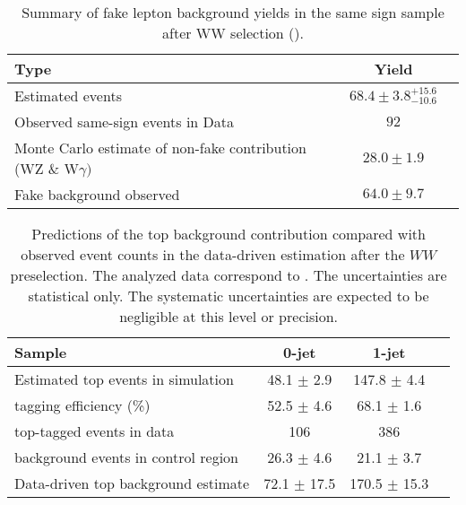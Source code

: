 \begin{table}[!htbp]
\begin{center}
\begin{tabular}{|l|c|c|}
\hline
Type                                                             & Yield \\
\hline
Estimated events                                                 &  $68.4\pm3.8^{+15.6}_{-10.6}$  \\
\hline
Observed same-sign events in Data                                &  $92$        \\
Monte Carlo estimate of non-fake contribution (WZ \& W$\gamma)$  & $28.0\pm1.9$ \\
Fake background observed                                         & $64.0\pm9.7$ \\
\hline
\end{tabular}
\caption{Summary of fake lepton background yields in the same sign sample after WW selection (\lpintlumi). }
\label{tab:lp_FakeLeptonBkgPrediction_SameSignSample}
\end{center}
\end{table}

\begin{table}[!htbp]
\begin{center}
\begin{tabular}{l c c c}
\hline
Sample                                        &   0-jet          & 1-jet          \\
\hline
Estimated top events in simulation  	      &  48.1 $\pm$ 2.9  & 147.8 $\pm$ 4.4 \\
tagging efficiency (\%)                       &  52.5 $\pm$ 4.6  &  68.1 $\pm$ 1.6 \\
top-tagged events in data           	      &          106     &    386          \\
background events in control region           &  26.3 $\pm$ 4.6  &  21.1 $\pm$ 3.7 \\
Data-driven top background estimate           &  72.1 $\pm$ 17.5 & 170.5 $\pm$ 15.3\\
\hline
\end{tabular}
\caption{Predictions of the top background contribution compared 
with observed event counts in the data-driven estimation after the $WW$ preselection. 
The analyzed data correspond to \lpintlumi.
The uncertainties are statistical only. The systematic uncertainties are expected to be 
negligible at this level or precision.}
\label{tab:lp_ttbar_est}
\end{center}
\end{table}

